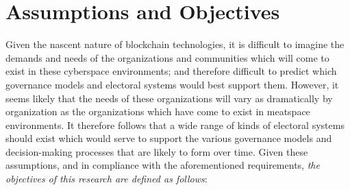 \section{Assumptions and Objectives}\label{sec:objectives}
Given the nascent nature of blockchain technologies, it is difficult to imagine
the demands and needs of the organizations and communities which will come to
exist in these cyberspace environments; and therefore difficult to predict which
governance models and electoral systems would best support them. However, it
seems likely that the needs of these organizations will vary as dramatically by
organization as the organizations which have come to exist in meatspace
environments. It therefore follows that a wide range of kinds of electoral
systems should exist which would serve to support the various governance models
and decision-making processes that are likely to form over time. Given these
assumptions, and in compliance with the aforementioned requirements, \emph{the
objectives of this research are defined as follows}:

